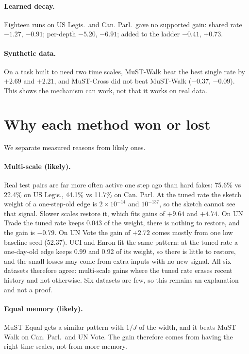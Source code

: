 \documentclass[11pt,a4paper]{article}
\theoremstyle{remark}
\begin{document}
\paragraph{Learned decay.} Eighteen runs on US Legis.\ and Can. Parl.\ gave no supported gain: shared rate $-1.27$, $-0.91$; per-depth $-5.20$, $-6.91$; added to the ladder $-0.41$, $+0.73$.
\paragraph{Synthetic data.} On a task built to need two time scales, MuST-Walk beat the best single rate by $+2.69$ and $+2.21$, and MuST-Cross did not beat MuST-Walk ($-0.37$, $-0.09$). This shows the mechanism can work, not that it works on real data.

\section{Why each method won or lost}\label{sec:why}
We separate measured reasons from likely ones.

\paragraph{Multi-scale (likely).} Real test pairs are far more often active one step ago than hard fakes: 75.6\% vs 22.4\% on US Legis., 44.1\% vs 11.7\% on Can. Parl. At the tuned rate the sketch weight of a one-step-old edge is $2\times10^{-14}$ and $10^{-137}$, so the sketch cannot see that signal. Slower scales restore it, which fits gains of $+9.64$ and $+4.74$. On UN Trade the tuned rate keeps $0.043$ of the weight, there is nothing to restore, and the gain is $-0.79$. On UN Vote the gain of $+2.72$ comes mostly from one low baseline seed (52.37). UCI and Enron fit the same pattern: at the tuned rate a one-day-old edge keeps 0.99 and 0.92 of its weight, so there is little to restore, and the small losses may come from extra inputs with no new signal. All six datasets therefore agree: multi-scale gains where the tuned rate erases recent history and not otherwise. Six datasets are few, so this remains an explanation and not a proof.

\paragraph{Equal memory (likely).} MuST-Equal gets a similar pattern with $1/J$ of the width, and it beats MuST-Walk on Can. Parl.\ and UN Vote. The gain therefore comes from having the right time scales, not from more memory.
\end{document}

